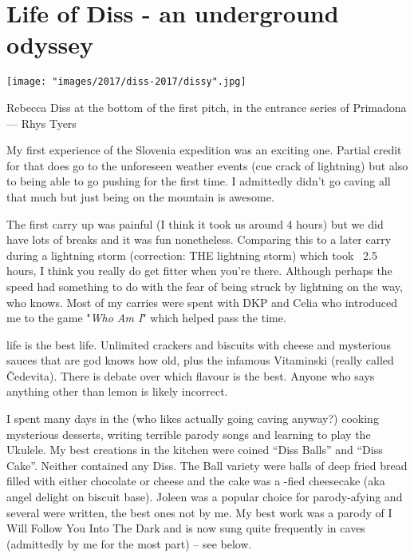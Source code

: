 \section{Life of Diss - an underground odyssey}



\begin{marginfigure} \centering
\texttt{[image: "images/2017/diss-2017/dissy".jpg]}
\caption{Rebecca Diss at the bottom of the first pitch, in the entrance series of Primadona --- Rhys Tyers}
\end{marginfigure}

My first experience of the Slovenia expedition was an exciting one. Partial credit for that does go to the unforeseen weather events (cue crack of lightning) but also to being able to go pushing for the first time. I admittedly didn’t go caving all that much but just being on the mountain is awesome.
 
The first carry up  was painful (I think it took us around 4 hours) but we did have lots of breaks and it was fun nonetheless. Comparing this to a later carry during a lightning storm (correction: THE lightning storm) which took ~2.5 hours, I think you really do get fitter when you’re there. Although perhaps the speed had something to do with the fear of being struck by lightning on the way, who knows. Most of my carries were spent with DKP and Celia who introduced me to the game "\textit{Who Am I}" which helped pass the time.

 life is the best life. Unlimited crackers and biscuits with cheese and mysterious sauces that are god knows how old, plus the infamous Vitaminski (really called \v{C}edevita). There is debate over which flavour is the best. Anyone who says anything other than lemon is likely incorrect.



I spent many days in the  (who likes actually going caving anyway?) cooking mysterious desserts, writing terrible parody songs and learning to play the Ukulele. My best creations in the  kitchen were coined “Diss Balls” and “Diss Cake”. Neither contained any Diss. The Ball variety were balls of deep fried bread filled with either chocolate or cheese and the cake was a -fied cheesecake (aka angel delight on biscuit base). Joleen was a popular choice for parody-afying and several were written, the best ones not by me. My best work was a parody of I Will Follow You Into The Dark and is now sung quite frequently in caves (admittedly by me for the most part) – see below.


